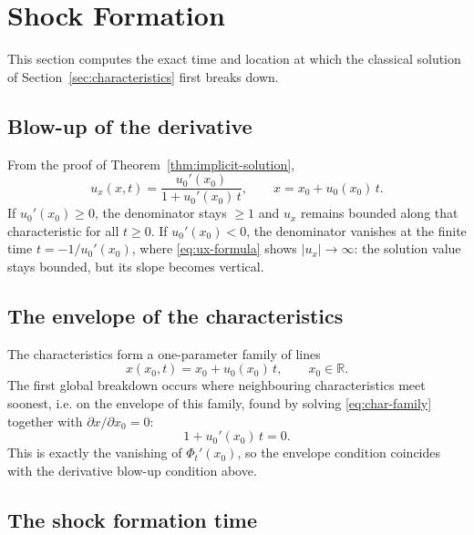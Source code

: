 \section{Shock Formation}
\label{sec:shock-formation}

This section computes the exact time and location at which the
classical solution of Section~\ref{sec:characteristics} first breaks
down.

\subsection{Blow-up of the derivative}
\label{subsec:shock-derivative-blowup}

From the proof of Theorem~\ref{thm:implicit-solution},
\begin{equation}
  \label{eq:ux-formula}
  u_x(x,t) = \frac{u_0'(x_0)}{1 + u_0'(x_0)\, t}, \qquad x = x_0 + u_0(x_0)\, t.
\end{equation}
If $u_0'(x_0) \geq 0$, the denominator stays $\geq 1$ and $u_x$ remains
bounded along that characteristic for all $t\geq0$. If $u_0'(x_0) < 0$,
the denominator vanishes at the finite time $t = -1/u_0'(x_0)$, where
\eqref{eq:ux-formula} shows $|u_x| \to \infty$: the solution value stays
bounded, but its slope becomes vertical.

\subsection{The envelope of the characteristics}
\label{subsec:envelope}

The characteristics form a one-parameter family of lines
\begin{equation}
  \label{eq:char-family}
  x(x_0, t) = x_0 + u_0(x_0)\, t, \qquad x_0 \in \mathbb{R}.
\end{equation}
The first global breakdown occurs where neighbouring characteristics meet
soonest, i.e. on the envelope of this family, found by solving
\eqref{eq:char-family} together with $\partial x/\partial x_0 = 0$:
\begin{equation}
  \label{eq:envelope-condition}
  1 + u_0'(x_0)\, t = 0.
\end{equation}
This is exactly the vanishing of $\Phi_t'(x_0)$, so the envelope
condition coincides with the derivative blow-up condition above.

\subsection{The shock formation time}
\label{subsec:shock-time}

